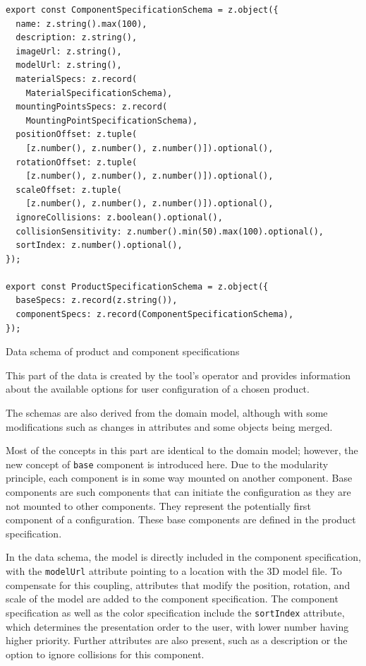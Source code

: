 \begin{listing}[h]
\begin{verbatim}
export const ComponentSpecificationSchema = z.object({
  name: z.string().max(100),
  description: z.string(),
  imageUrl: z.string(),
  modelUrl: z.string(),
  materialSpecs: z.record(
    MaterialSpecificationSchema),
  mountingPointsSpecs: z.record(
    MountingPointSpecificationSchema),
  positionOffset: z.tuple(
    [z.number(), z.number(), z.number()]).optional(),
  rotationOffset: z.tuple(
    [z.number(), z.number(), z.number()]).optional(),
  scaleOffset: z.tuple(
    [z.number(), z.number(), z.number()]).optional(),
  ignoreCollisions: z.boolean().optional(),
  collisionSensitivity: z.number().min(50).max(100).optional(),
  sortIndex: z.number().optional(),
});

export const ProductSpecificationSchema = z.object({
  baseSpecs: z.record(z.string()),
  componentSpecs: z.record(ComponentSpecificationSchema),
});
\end{verbatim}
\caption{Data schema of product and component specifications}
\label{lisiting:schema-componentspecification}
\end{listing}

This part of the data is created by the tool's operator and provides information about the available options for user configuration of a chosen product.

The schemas are also derived from the domain model, although with some modifications such as changes in attributes and some objects being merged.

Most of the concepts in this part are identical to the domain model; however, the new concept of \texttt{base} component is introduced here. Due to the modularity principle, each component is in some way mounted on another component. Base components are such components that can initiate the configuration as they are not mounted to other components. They represent the potentially first component of a configuration. These base components are defined in the product specification.

In the data schema, the model is directly included in the component specification, with the \texttt{modelUrl} attribute pointing to a location with the 3D model file. To compensate for this coupling, attributes that modify the position, rotation, and scale of the model are added to the component specification. The component specification as well as the color specification include the \texttt{sortIndex} attribute, which determines the presentation order to the user, with lower number having higher priority. Further attributes are also present, such as a description or the option to ignore collisions for this component.

